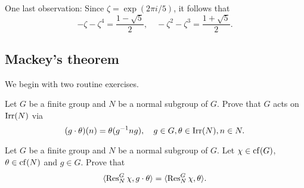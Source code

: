 One last observation: 
Since $\zeta=\exp(2\pi i/5)$, it follows
that 
\[
-\zeta-\zeta^4=\frac{1-\sqrt{5}}{2},
\quad 
-\zeta^2-\zeta^3=\frac{1+\sqrt{5}}{2}.
\]











\subsection{Mackey's theorem}

We begin with two routine exercises. 


\begin{exercise}
\label{xca:conjugate_chars1}
Let $G$ be a finite group and $N$ be a normal subgroup
of $G$. Prove that $G$ acts on $\operatorname{Irr}(N)$ via 
\[
(g\cdot\theta)(n)=\theta(g^{-1}ng),\quad 
g\in G,\theta\in\operatorname{Irr}(N),n\in N.
\]
\end{exercise}

\begin{exercise}
\label{xca:conjugate_chars2}
Let $G$ be a finite group and $N$ be a normal subgroup of $G$. 
Let $\chi\in\operatorname{cf}(G)$, $\theta\in\operatorname{cf}(N)$ and $g\in G$. Prove that
\[
\langle\operatorname{Res}_N^G\chi,g\cdot\theta\rangle=\langle\operatorname{Res}_N^G\chi,\theta\rangle.
\]
\end{exercise}


